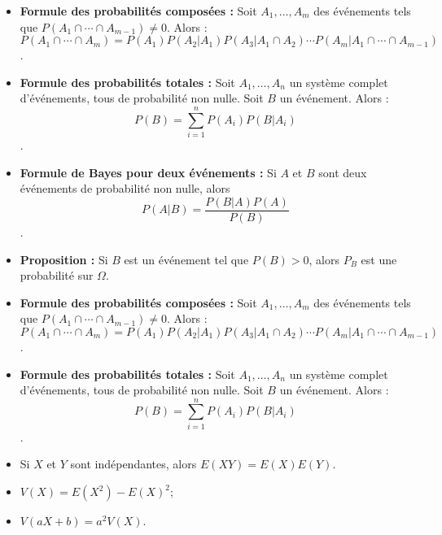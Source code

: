 \documentclass{article}
\begin{document}
\begin{itemize}
	\item \textbf{Formule des probabilités composées :} Soit \( A_1, \ldots, A_m \) des événements tels que \( P(A_1 \cap \cdots \cap A_{m-1}) \neq 0 \). Alors : \[ P(A_1 \cap \cdots \cap A_m) = P(A_1) P(A_2 | A_1) P(A_3 | A_1 \cap A_2) \cdots P(A_m | A_1 \cap \cdots \cap A_{m-1}) \].
	\item \textbf{Formule des probabilités totales :} Soit \( A_1, \ldots, A_n \) un système complet d'événements, tous de probabilité non nulle. Soit \( B \) un événement. Alors :
\[ P(B) = \sum_{i=1}^{n} P(A_i) P(B | A_i) \].
	\item \textbf{Formule de Bayes pour deux événements :} Si \( A \) et \( B \) sont deux événements de probabilité non nulle, alors
\[ P(A | B) = \frac{P(B | A) P(A)}{P(B)} \].
	\item \textbf{Proposition :} Si \( B \) est un événement tel que \( P(B) > 0 \), alors \( P_B \) est une probabilité sur \( \Omega \).
	\item \textbf{Formule des probabilités composées :} Soit \( A_1, \ldots, A_m \) des événements tels que \( P(A_1 \cap \cdots \cap A_{m-1}) \neq 0 \). Alors :
\[ P(A_1 \cap \cdots \cap A_m) = P(A_1) P(A_2 | A_1) P(A_3 | A_1 \cap A_2) \cdots P(A_m | A_1 \cap \cdots \cap A_{m-1}) \].

	\item \textbf{Formule des probabilités totales :} Soit \( A_1, \ldots, A_n \) un système complet d'événements, tous de probabilité non nulle. Soit \( B \) un événement. Alors :
\[ P(B) = \sum_{i=1}^{n} P(A_i) P(B | A_i) \].

	\item Si \( X \) et \( Y \) sont indépendantes, alors \( E(XY) = E(X) E(Y) \).
    \item \( V(X) = E(X^2) - E(X)^2 \);
    \item \( V(aX + b) = a^2 V(X) \).





\end{itemize}
\end{document}
